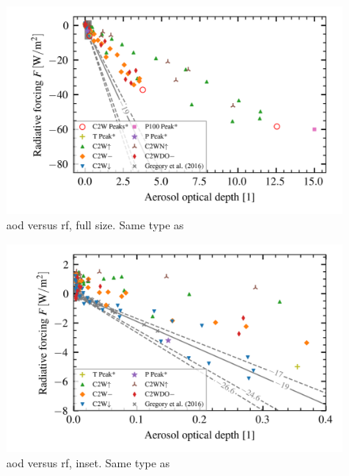 \documentclass[twocol]{ametsocV5}
\begin{document}
\begin{figure}
  \begin{center}
    \includegraphics[width=0.95\linewidth]{figures/aod_vs_toa_avg_full.png}
  \end{center}
  \caption{\acrshort{aod} versus \acrshort{rf}, full size. Same type as
    \citet{gregory2016}}%
  \label{fig:aod_vs_toa_full}
\end{figure}

\begin{figure}
  \begin{center}
    \includegraphics[width=0.95\linewidth]{figures/aod_vs_toa_avg_inset.png}
  \end{center}
  \caption{\acrshort{aod} versus \acrshort{rf}, inset. Same type as
    \citet{gregory2016}}%
  \label{fig:aod_vs_toa_inset}
\end{figure}
\end{document}
